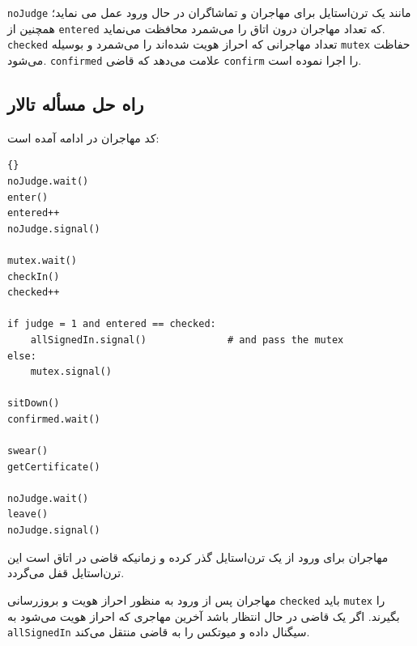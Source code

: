 \documentclass{book}
\newcommand{\clearemptydoublepage}{\newpage\cleardoublepage}
\begin{document}

    {\tt noJudge} 
    مانند یک ترن‌استایل برای مهاجران و تماشاگران در حال ورود عمل می نماید؛ همچنین از {\tt entered} که تعداد مهاجران درون اتاق را می‌شمرد 
    محافظت می‌نماید.  {\tt checked} تعداد مهاجرانی که احراز هویت شده‌اند را می‌شمرد و بوسیله {\tt mutex} حفاظت می‌شود. 
    {\tt confirmed}
    علامت می‌دهد که قاضی {\tt confirm} را اجرا نموده است. 

\clearemptydoublepage
\subsection{راه حل مسأله تالار }

    کد مهاجران در ادامه آمده است:

\begin{latin}
\begin{lstlisting}[title=\rl{راهنمایی مسأله تالار \lr{Faneuil} (مهاجر)}]{}
noJudge.wait()
enter()
entered++
noJudge.signal()

mutex.wait()
checkIn()
checked++

if judge = 1 and entered == checked:
    allSignedIn.signal()              # and pass the mutex
else:
    mutex.signal()

sitDown()
confirmed.wait()

swear()
getCertificate()

noJudge.wait()
leave()
noJudge.signal()
\end{lstlisting}
\end{latin}

    مهاجران برای ورود از یک ترن‌استایل گذر کرده و زمانیکه قاضی در اتاق است این ترن‌استایل قفل می‌گردد.

    مهاجران پس از ورود به منظور احراز هویت و بروزرسانی {\tt checked} باید  {\tt mutex} را بگیرند. اگر یک قاضی در حال انتظار باشد  آخرین مهاجری 
    که احراز هویت می‌شود به  {\tt allSignedIn} سیگنال داده و میوتکس را به قاضی منتقل می‌کند. 
\end{document}

